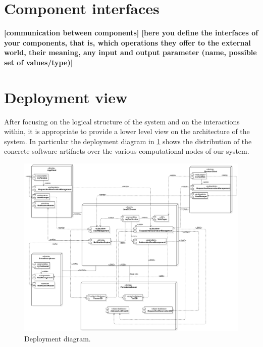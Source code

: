 \section{Component interfaces}\label{sec:componentInterfaces}
\textbf{[communication between components] [here you define the interfaces of your components, that is, which operations they offer to the external world, their meaning, any input and output parameter (name, possible set of values/type)]}

\lipsum[1]













\clearpage%
\section{Deployment view}\label{sec:deployment}
After focusing on the logical structure of the system and on the interactions within, it is appropriate to provide a lower level view on the architecture of the system. In particular the deployment diagram in \cref{fig:deployment} shows the distribution of the concrete software artifacts over the various computational nodes of our system.

\begin{figure}%
	\centering%
	\includegraphics[width=\linewidth]{img/Deploy__DeploymentDiagram_4}%
	\caption{Deployment diagram.}\label{fig:deployment}%
\end{figure}

